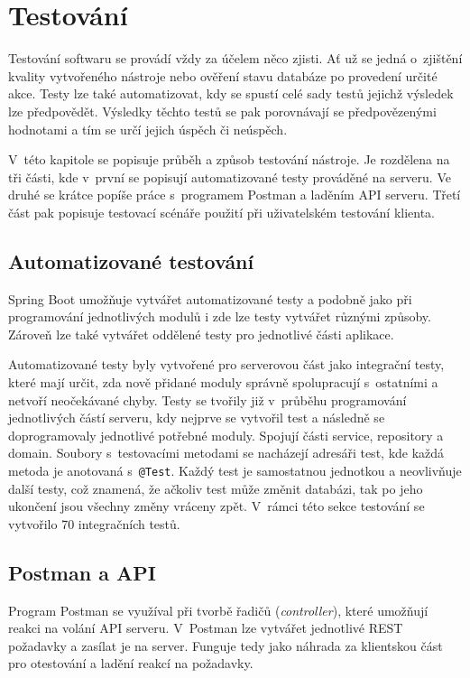 \chapter{Testování}
\label{testovani}

Testování softwaru se provádí vždy za účelem něco zjisti. Ať už se jedná o~zjištění kvality vytvořeného nástroje nebo ověření stavu databáze po provedení určité akce. Testy lze také automatizovat, kdy se spustí celé sady testů jejichž výsledek lze předpovědět. Výsledky těchto testů se pak porovnávají se předpovězenými hodnotami a tím se určí jejich úspěch či neúspěch.  

V~této kapitole se popisuje průběh a způsob testování nástroje. Je rozdělena na tři části, kde v~první se popisují automatizované testy prováděné na serveru. Ve druhé se krátce popíše práce s~programem Postman a laděním API serveru. Třetí část pak popisuje testovací scénáře použití při uživatelském testování klienta. 


\section{Automatizované testování}

Spring Boot umožňuje vytvářet automatizované testy a podobně jako při programování jednotlivých modulů i zde lze testy vytvářet různými způsoby. Zároveň lze také vytvářet oddělené testy pro jednotlivé části aplikace. 

Automatizované testy byly vytvořené pro serverovou část jako integrační testy, které mají určit, zda nově přidané moduly správně spolupracují s~ostatními a netvoří neočekávané chyby. Testy se tvořily již v~průběhu programování jednotlivých částí serveru, kdy nejprve se vytvořil test a následně se doprogramovaly jednotlivé potřebné moduly. Spojují části service, repository a domain. Soubory s~testovacími metodami se nacházejí adresáři test, kde každá metoda je anotovaná s~\texttt{@Test}. Každý test je samostatnou jednotkou a neovlivňuje další testy, což znamená, že ačkoliv test může změnit databázi, tak po jeho ukončení jsou všechny změny vráceny zpět. V~rámci této sekce testování se vytvořilo 70 integračních testů.


\section{Postman a API}

Program Postman se využíval při tvorbě řadičů (\textit{controller}), které umožňují reakci na volání API serveru. V~Postman lze vytvářet jednotlivé REST požadavky a zasílat je na server. Funguje tedy jako náhrada za klientskou část pro otestování a ladění reakcí na požadavky. 

